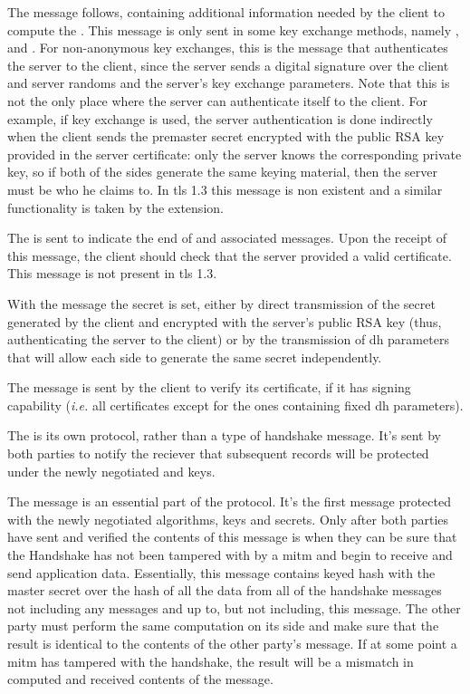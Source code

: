 \documentclass{llncs}
\begin{document}
The  message follows, containing additional information
needed by the client to compute the . This message
is only sent in some key exchange methods, namely , 
and . For non-anonymous key exchanges, this is the message that authenticates the server to the client,
since the server sends a digital signature over the client and server randoms
and the server's key exchange parameters. Note that this is not the only place where the
server can authenticate itself to the client. For example, if  key
exchange is used, the server authentication is done indirectly when the client
sends the premaster secret encrypted with the public RSA key provided in the
server certificate: only the server knows the corresponding private key, so if
both of the sides generate the same keying material, then the server must be who
he claims to. In \gls{tls} 1.3 this message is non existent and a similar
functionality is taken by the  extension.

The  is sent to indicate the end of 
and associated messages. Upon the receipt of this message, the client should check
that the server provided a valid certificate. This message is not present in \gls{tls} 1.3.

With the  message the  secret is
set, either by direct transmission of the secret generated by the client
and encrypted with the server's public RSA key (thus, authenticating the server to the client)
or by the transmission of \gls{dh} parameters that will allow each side to generate
the same  secret independently.

The  message is sent by the client to verify its
certificate, if it has signing capability (\textit{i.e.} all certificates except for the ones
containing fixed \gls{dh} parameters).

The  is its own protocol, rather than a type of handshake
message. It's sent by both parties to notify the reciever that subsequent records
will be protected under the newly negotiated  and keys.

The  message is an essential part of the protocol. It's the first
message protected with the newly negotiated algorithms, keys and secrets. Only after
both parties have sent and verified the contents of this message is when they can
be sure that the Handshake has not been tampered with by a \gls{mitm} and begin to
receive and send application data. Essentially, this message contains keyed hash
with the master secret over the hash of all the data from all of the
handshake messages not including any  messages and up to, but
not including, this message. The other party must perform the same computation on its
side and make sure that the result is identical to the contents of the other party's
 message. If at some point a \gls{mitm} has tampered with the
handshake, the result will be a mismatch in computed and received contents of the
 message.
\end{document}
